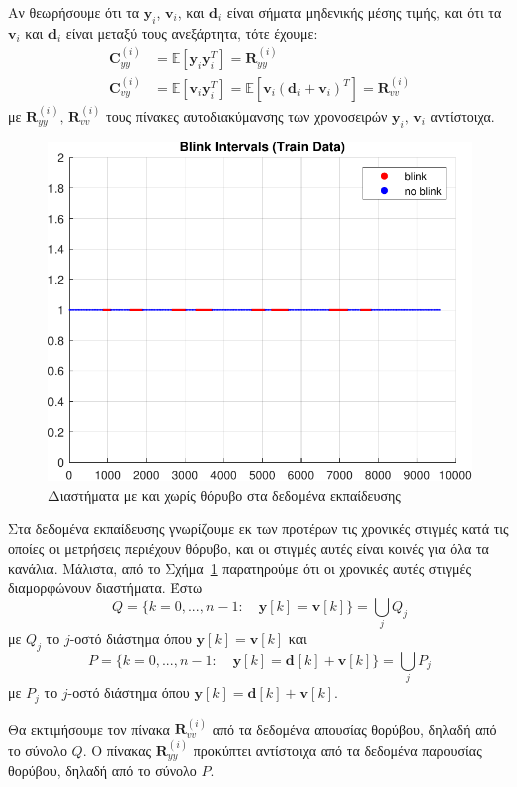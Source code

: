 \documentclass[a4paper,12pt]{article}
\begin{document}
Αν θεωρήσουμε ότι τα $\mathbf{y}_i$, $\mathbf{v}_i$, και $\mathbf{d}_i$ είναι σήματα μηδενικής μέσης τιμής, 
και ότι τα $\mathbf{v}_i$ και $\mathbf{d}_i$ είναι μεταξύ τους ανεξάρτητα, τότε έχουμε:
\[
\begin{aligned}
    \mathbf{C}_{yy}^{(i)} &= \mathbb{E}[\mathbf{y}_i\mathbf{y}_i^T] = \mathbf{R}_{yy}^{(i)} \\
    \mathbf{C}_{vy}^{(i)} &= \mathbb{E}[\mathbf{v}_i\mathbf{y}_i^T] = 
    \mathbb{E}[\mathbf{v}_i(\mathbf{d}_i + \mathbf{v}_i)^T] = \mathbf{R}_{vv}^{(i)}
\end{aligned}
\]
με $\mathbf{R}_{yy}^{(i)}, \, \mathbf{R}_{vv}^{(i)}$ τους πίνακες αυτοδιακύμανσης των χρονοσειρών
$\mathbf{y}_i, \, \mathbf{v}_i$ αντίστοιχα.

\begin{figure}
    \centering
    \includegraphics[width=0.5\linewidth]{plot/clean_and_noisy_intervals.pdf}
    \caption{Διαστήματα με και χωρίς θόρυβο στα δεδομένα εκπαίδευσης}
    \label{fig:clean_and_noisy_intervals}
\end{figure}

Στα δεδομένα εκπαίδευσης γνωρίζουμε εκ των προτέρων τις χρονικές στιγμές κατά τις οποίες οι μετρήσεις 
περιέχουν θόρυβο, και οι στιγμές αυτές είναι κοινές για όλα τα κανάλια. Μάλιστα, από το 
Σχήμα~\ref{fig:clean_and_noisy_intervals} παρατηρούμε ότι οι χρονικές αυτές στιγμές διαμορφώνουν διαστήματα. 
Έστω
\[
Q = \{k = 0,...,n-1:\quad \mathbf{y}[k] = \mathbf{v}[k]\} = \underset{j}{{\bigcup}} Q_j
\]
με $Q_j$ το $j$-οστό διάστημα όπου $\mathbf{y}[k] = \mathbf{v}[k]$ και
\[
P = \{k = 0,...,n-1:\quad \mathbf{y}[k] = \mathbf{d}[k] + \mathbf{v}[k]\} = \underset{j}{{\bigcup}} P_j
\]
με $P_j$ το $j$-οστό διάστημα όπου $\mathbf{y}[k] = \mathbf{d}[k] + \mathbf{v}[k]$. 

Θα εκτιμήσουμε τον πίνακα $\mathbf{R}_{vv}^{(i)}$ από τα δεδομένα απουσίας θορύβου, δηλαδή από το σύνολο $Q$.  
Ο πίνακας $\mathbf{R}_{yy}^{(i)}$ προκύπτει αντίστοιχα από τα δεδομένα παρουσίας θορύβου, δηλαδή από το σύνολο
$P$.
\end{document}
